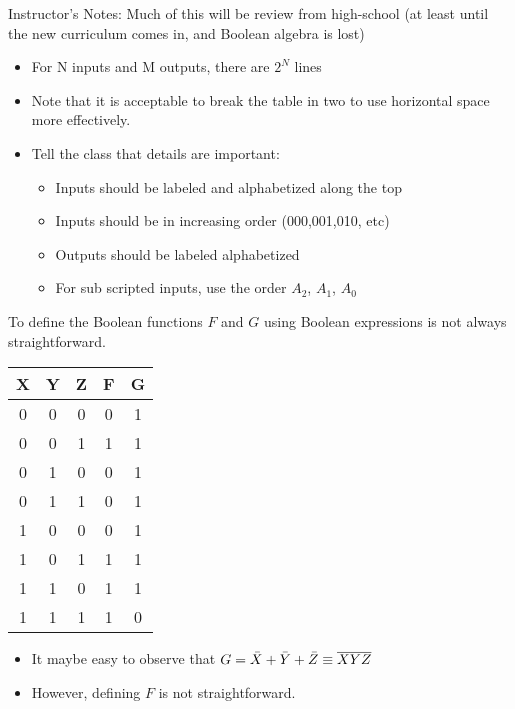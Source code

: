 \BNotes\ifnum{}
\begin{frame}[fragile]
Instructor's Notes:
Much of this will be review from high-school (at least until the
new curriculum comes in, and Boolean algebra is lost)
\begin{itemize}
\item For N inputs and M outputs, there are $2^N$ lines
\item Note that it is acceptable to break the table in two to use
horizontal space more effectively.
\item Tell the class that details are important:
\begin{itemize}
	\item Inputs should be labeled and alphabetized along the top
	\item Inputs should be in increasing order (000,001,010, etc)
	\item Outputs should be labeled alphabetized
	\item For sub scripted inputs, use the order $A_2$, $A_1$, $A_0$
\end{itemize}
\end{itemize}
\end{frame}
\fi


\begin{frame}[fragile]

\begin{tcolorbox}[enhanced,attach boxed title to top center={yshift=-3mm,yshifttext=-1mm},
  colback=blue!5!white,colframe=blue!75!black,colbacktitle=blue!80!black,
  title=Think About It,fonttitle=\bfseries,
  boxed title style={size=small,colframe=red!50!black} ]
To define the Boolean functions $F$ and $G$ using Boolean expressions is not always straightforward. 
{\footnotesize
  \begin{center}
		\begin{tabular}{ccc|cc}
		X&Y&Z & F & G \\\hline
		0&0&0 & 0 & 1 \\
		0&0&1 & 1 & 1 \\
		0&1&0 & 0 & 1 \\
		0&1&1 & 0 & 1 \\
		1&0&0 & 0 & 1 \\
		1&0&1 & 1 & 1 \\
		1&1&0 & 1 & 1 \\
		1&1&1 & 1 & 0 \\
		\end{tabular}
		\end{center}	
}  
    \begin{itemize}
	\item  It maybe easy to observe that $G = \Bar{X}+\Bar{Y}+\Bar{Z} \equiv \overline{XYZ}$
	\item  However, defining $F$ is not straightforward. \ifnum{}\fi
\end{itemize}

\end{tcolorbox}

\end{frame}



